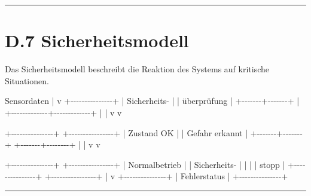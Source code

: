 \documentclass[
]{article}
\newenvironment{Shaded}{}{}
\newcommand{\NormalTok}[1]{#1}
\begin{document}
\begin{center}\rule{0.5\linewidth}{0.5pt}\end{center}

\section{D.7 Sicherheitsmodell}\label{d.7-sicherheitsmodell}

Das Sicherheitsmodell beschreibt die Reaktion des Systems auf kritische
Situationen.

\begin{Shaded}
\begin{Highlighting}[]
\NormalTok{                 Sensordaten}
\NormalTok{                      |}
\NormalTok{                      v}
\NormalTok{              +{-}{-}{-}{-}{-}{-}{-}{-}{-}{-}{-}{-}{-}{-}{-}+}
\NormalTok{              | Sicherheits{-}  |}
\NormalTok{              | überprüfung   |}
\NormalTok{              +{-}{-}{-}{-}{-}{-}{-}+{-}{-}{-}{-}{-}{-}{-}+}
\NormalTok{                      |}
\NormalTok{        +{-}{-}{-}{-}{-}{-}{-}{-}{-}{-}{-}{-}{-}+{-}{-}{-}{-}{-}{-}{-}{-}{-}{-}{-}{-}{-}+}
\NormalTok{        |                           |}
\NormalTok{        v                           v}

\NormalTok{+{-}{-}{-}{-}{-}{-}{-}{-}{-}{-}{-}{-}{-}{-}{-}+          +{-}{-}{-}{-}{-}{-}{-}{-}{-}{-}{-}{-}{-}{-}{-}{-}+}
\NormalTok{| Zustand OK    |          | Gefahr erkannt |}
\NormalTok{+{-}{-}{-}{-}{-}{-}{-}+{-}{-}{-}{-}{-}{-}{-}+          +{-}{-}{-}{-}{-}{-}{-}+{-}{-}{-}{-}{-}{-}{-}{-}+}
\NormalTok{        |                         |}
\NormalTok{        v                         v}

\NormalTok{+{-}{-}{-}{-}{-}{-}{-}{-}{-}{-}{-}{-}{-}{-}{-}+          +{-}{-}{-}{-}{-}{-}{-}{-}{-}{-}{-}{-}{-}{-}{-}{-}+}
\NormalTok{| Normalbetrieb |          | Sicherheits{-}  |}
\NormalTok{|               |          | stopp         |}
\NormalTok{+{-}{-}{-}{-}{-}{-}{-}{-}{-}{-}{-}{-}{-}{-}{-}+          +{-}{-}{-}{-}{-}{-}{-}{-}{-}{-}{-}{-}{-}{-}{-}{-}+}
\NormalTok{                                      |}
\NormalTok{                                      v}
\NormalTok{                              +{-}{-}{-}{-}{-}{-}{-}{-}{-}{-}{-}{-}{-}{-}{-}+}
\NormalTok{                              | Fehlerstatus |}
\NormalTok{                              +{-}{-}{-}{-}{-}{-}{-}{-}{-}{-}{-}{-}{-}{-}{-}+}
\end{Highlighting}
\end{Shaded}

\begin{center}\rule{0.5\linewidth}{0.5pt}\end{center}
\end{document}
